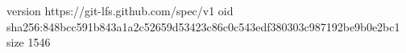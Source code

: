 version https://git-lfs.github.com/spec/v1
oid sha256:848bcc591b843a1a2c52659d53423c86c0c543edf380303c987192be9b0e2bc1
size 1546
